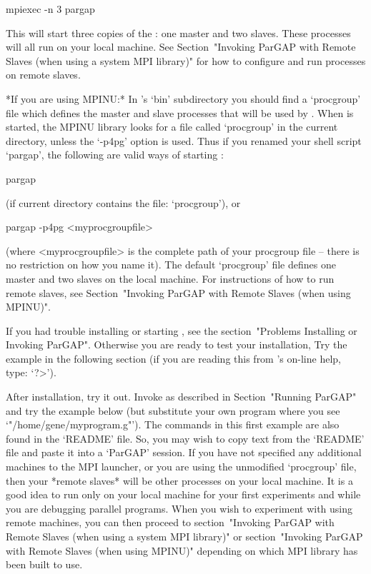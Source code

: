 \begintt
mpiexec -n 3 pargap
\endtt

This will start three copies of the {\ParGAP}: one master and two slaves. These
processes will all run on your local machine. See 
Section~"Invoking ParGAP with Remote Slaves (when using a system MPI library)"
for how to configure and run processes on remote slaves.

*If you are using MPINU:*
In {\ParGAP}'s `bin' subdirectory you should find a `procgroup' file which
defines the master and slave processes that will be used  by  {\ParGAP}.
When {\ParGAP} is started, the MPINU library looks for a file called `procgroup'  
in the current directory, unless the `-p4pg' option is used. Thus if you renamed
your shell script `pargap', the following  are  valid  ways  of  starting
{\ParGAP}:

\begintt
pargap
\endtt

(if current directory contains the file: `procgroup'), or

pargap -p4pg <myprocgroupfile>

(where <myprocgroupfile> is the complete path of your  procgroup  file --
there is no restriction on how you name it). The default `procgroup' file
defines one master and two slaves on the local machine. For instructions of 
how to run remote slaves, see 
Section~"Invoking ParGAP with Remote Slaves (when using MPINU)".

If you had trouble installing or starting {\ParGAP}, see the 
section~"Problems Installing or Invoking ParGAP". Otherwise you are ready 
to test your installation, Try the example in the following section (if you 
are reading this from  {\GAP}'s on-line help, type: `?>').


After  installation,  try  it  out.  Invoke  {\ParGAP}  as  described  in
Section~"Running ParGAP" and try the example below (but  substitute  your
own program where you see `"/home/gene/myprogram.g"').  The  commands  in
this first example are also found in the `README' file. So, you may  wish
to copy text from the `README' file and paste it into a `ParGAP' session.
If you have not specified any additional machines to the MPI launcher, or you
are using the unmodified `procgroup' file, then your *remote slaves*
will be other processes on your local machine. It is a good idea  to  run
only on your local machine for your first experiments and while  you  are
debugging parallel programs. When  you  wish  to  experiment  with  using
remote machines, you can then proceed to 
section~"Invoking ParGAP with Remote Slaves (when using a system MPI library)" 
or section~"Invoking ParGAP with Remote Slaves (when using MPINU)" depending
on which MPI library {\ParGAP} has been built to use.


